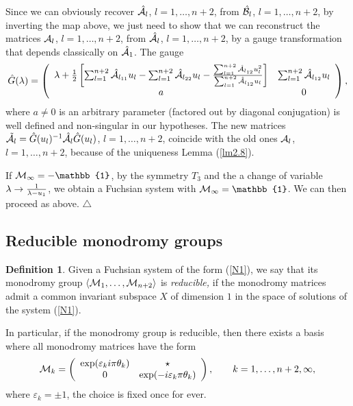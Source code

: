 \documentclass[12pt]{article}
\def\eps{\varepsilon}
\newcommand{\ID}{\mathbb{1}}
\theoremstyle{definition}
\newtheorem{df}{Definition}
\theoremstyle{theorem}
\begin{document}
Since we can obviously recover $\hat{\cal A}_l$, $l=1,\dots,n+2$, 
from $\hat{\cal B}_l$,  $l=1,\dots,n+2$, by inverting the map above, 
we just need to show that we can reconstruct the matrices ${\cal A}_l$,
$l=1,\dots,n+2$, from $\hat{\cal A}_l$, $l=1,\dots,n+2$,  by a 
gauge transformation  that depends classically on $\hat{\cal A}_1$. 
The gauge
$$
\hat G(\lambda)=\left(\begin{array}{cc}
\lambda+{1\over 2}\left[\sum_{l=1}^{n+2}\hat{\cal A}_{l_{11}} u_l
-\sum_{l=1}^{n+2}\hat{\cal A}_{l_{22}} u_l - 
{\sum_{l=1}^{n+2}\hat{\cal A}_{l_{12}} u_l^2\over 
\sum_{l=1}^{n+2}\hat{\cal A}_{l_{12}} u_l} \right] &
\sum_{l=1}^{n+2}\hat{\cal A}_{l_{12}} u_l\\
a &0\\ \end{array}\right),
$$
where $a\neq 0$ is an arbitrary parameter (factored out by diagonal 
conjugation) is well defined and non-singular in our hypotheses. 
The new matrices $\tilde{\cal A}_l=\hat G(u_l)^{-1}\hat{\cal A}_l
\hat G(u_l)$, $l=1,\dots,n+2$, coincide with the old ones 
${\cal A}_l$, $l=1,\dots,n+2$, because of the uniqueness
Lemma (\ref{lm2.8}).

If ${\cal M}_\infty=-\ID$, by the symmetry $T_3$ and the a change of
variable $\lambda\to{1\over \lambda-u_1}$, we obtain a Fuchsian system 
with ${\cal M}_\infty=\ID$. We can then proceed as above.
{\hfill$\bigtriangleup$}



\subsection{Reducible monodromy groups}

\begin{df}
Given a Fuchsian system of the form (\ref{N1}), we say that its 
monodromy group $\langle {\cal M}_1,\dots,{\cal M}_{n+2}\rangle$ 
is {\it reducible,}\/ if the monodromy matrices admit a
common invariant subspace $X$ of dimension $1$ in the space
of solutions of the system (\ref{N1}).
\end{df}

In particular, if the monodromy group is reducible, then there
exists a basis where all monodromy matrices have the form
\begin{equation}
{\cal M}_{k}=
\left(\begin{array}{cc}
\exp(\eps_ki\pi\theta_k) & \star\\
0 & \exp(-i\eps_k\pi\theta_k)
\end{array}\right),\qquad k=1,\dots,n+2,\infty,
\label{monrid}\end{equation}
where $\eps_k=\pm 1$, the choice is fixed once for ever.
\end{document}

